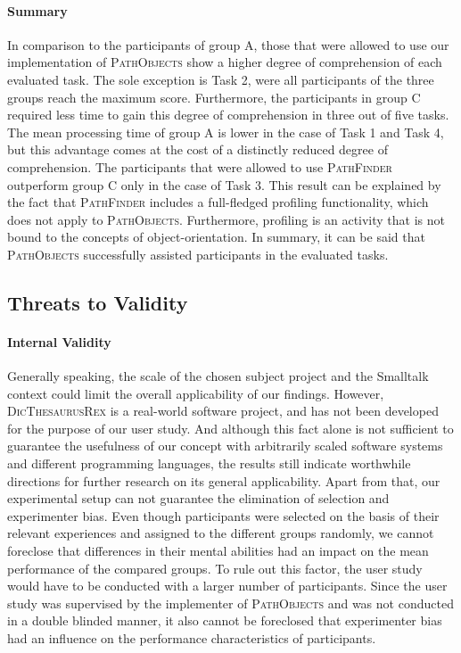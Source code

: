 \paragraph{Summary}
In comparison to the participants of group A, those that were allowed to use our implementation of \textsc{PathObjects} show a higher degree of comprehension of each evaluated task.
The sole exception is Task 2, were all participants of the three groups reach the maximum score.
Furthermore, the participants in group C required less time to gain this degree of comprehension in three out of five tasks.
The mean processing time of group A is lower in the case of Task 1 and Task 4, but this advantage comes at the cost of a distinctly reduced degree of comprehension.
The participants that were allowed to use \textsc{PathFinder} outperform group C only in the case of Task 3.
This result can be explained by the fact that \textsc{PathFinder} includes a full-fledged profiling functionality, which does not apply to \textsc{PathObjects}.
Furthermore, profiling is an activity that is not bound to the concepts of object-orientation.
In summary, it can be said that \textsc{PathObjects} successfully assisted participants in the evaluated tasks.

\subsection{Threats to Validity}
\paragraph{Internal Validity}
Generally speaking, the scale of the chosen subject project and the Smalltalk context could limit the overall applicability of our findings.
However, \textsc{DicThesaurusRex} is a real-world software project, and has not been developed for the purpose of our user study.
And although this fact alone is not sufficient to guarantee the usefulness of our concept with arbitrarily scaled software systems and different programming languages, the results still indicate worthwhile directions for further research on its general applicability.
Apart from that, our experimental setup can not guarantee the elimination of selection and experimenter bias.
Even though participants were selected on the basis of their relevant experiences and assigned to the different groups randomly, we cannot foreclose that differences in their mental abilities had an impact on the mean performance of the compared groups.
To rule out this factor, the user study would have to be conducted with a larger number of participants.
Since the user study was supervised by the implementer of \textsc{PathObjects} and was not conducted in a double blinded manner, it also cannot be foreclosed that experimenter bias had an influence on the performance characteristics of participants.

